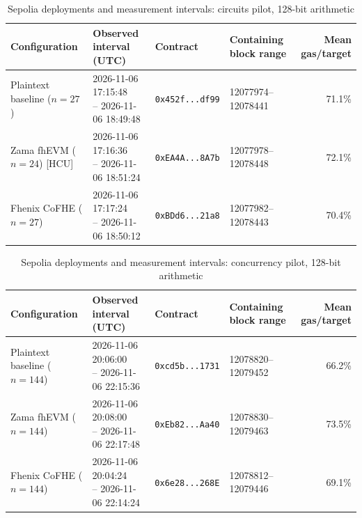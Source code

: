 \begin{table}[!t]
\caption{Sepolia deployments and measurement intervals: circuits pilot, 128-bit arithmetic}
\label{tab:sepolia-experiment-deployments-circuits-euint128}
\centering
\footnotesize
\setlength{\tabcolsep}{4pt}
\begin{tabular}{|l|l|l|l|r|}
\hline
\textbf{Configuration} &
\textbf{Observed interval (UTC)} &
\textbf{Contract} &
\textbf{Containing block range} &
\textbf{Mean gas/target} \\
\hline
Plaintext baseline (\(n=27\)) &
\shortstack[l]{2026-11-06 17:15:48 \\ -- 2026-11-06 18:49:48} &
\texttt{0x452f...df99} &
12077974--12078441 &
71.1\% \\
\hline
Zama fhEVM (\(n=24\)) [HCU] &
\shortstack[l]{2026-11-06 17:16:36 \\ -- 2026-11-06 18:51:24} &
\texttt{0xEA4A...8A7b} &
12077978--12078448 &
72.1\% \\
\hline
Fhenix CoFHE (\(n=27\)) &
\shortstack[l]{2026-11-06 17:17:24 \\ -- 2026-11-06 18:50:12} &
\texttt{0xBDd6...21a8} &
12077982--12078443 &
70.4\% \\
\hline
\end{tabular}
\end{table}

\begin{table}[!t]
\caption{Sepolia deployments and measurement intervals: concurrency pilot, 128-bit arithmetic}
\label{tab:sepolia-experiment-deployments-concurrency-euint128}
\centering
\footnotesize
\setlength{\tabcolsep}{4pt}
\begin{tabular}{|l|l|l|l|r|}
\hline
\textbf{Configuration} &
\textbf{Observed interval (UTC)} &
\textbf{Contract} &
\textbf{Containing block range} &
\textbf{Mean gas/target} \\
\hline
Plaintext baseline (\(n=144\)) &
\shortstack[l]{2026-11-06 20:06:00 \\ -- 2026-11-06 22:15:36} &
\texttt{0xcd5b...1731} &
12078820--12079452 &
66.2\% \\
\hline
Zama fhEVM (\(n=144\)) &
\shortstack[l]{2026-11-06 20:08:00 \\ -- 2026-11-06 22:17:48} &
\texttt{0xEb82...Aa40} &
12078830--12079463 &
73.5\% \\
\hline
Fhenix CoFHE (\(n=144\)) &
\shortstack[l]{2026-11-06 20:04:24 \\ -- 2026-11-06 22:14:24} &
\texttt{0x6e28...268E} &
12078812--12079446 &
69.1\% \\
\hline
\end{tabular}
\end{table}
